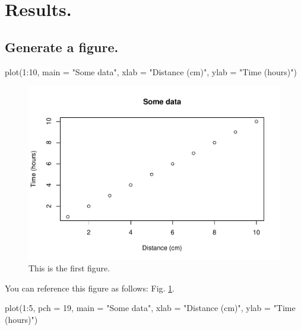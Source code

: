 \documentclass[12pt,halfline,a4paper,]{ouparticle}
\newenvironment{Shaded}{\begin{snugshade}}{\end{snugshade}}
\newcommand{\AttributeTok}[1]{\textcolor[rgb]{0.77,0.63,0.00}{#1}}
\newcommand{\DecValTok}[1]{\textcolor[rgb]{0.00,0.00,0.81}{#1}}
\newcommand{\FunctionTok}[1]{\textcolor[rgb]{0.00,0.00,0.00}{#1}}
\newcommand{\NormalTok}[1]{#1}
\newcommand{\SpecialCharTok}[1]{\textcolor[rgb]{0.00,0.00,0.00}{#1}}
\newcommand{\StringTok}[1]{\textcolor[rgb]{0.31,0.60,0.02}{#1}}
\begin{document}
\hypertarget{results.}{%
\section{Results.}\label{results.}}

\hypertarget{generate-a-figure.}{%
\subsection{Generate a figure.}\label{generate-a-figure.}}

\begin{Shaded}
\begin{Highlighting}[]
\FunctionTok{plot}\NormalTok{(}\DecValTok{1}\SpecialCharTok{:}\DecValTok{10}\NormalTok{, }\AttributeTok{main =} \StringTok{"Some data"}\NormalTok{, }\AttributeTok{xlab =} \StringTok{"Distance (cm)"}\NormalTok{, }
     \AttributeTok{ylab =} \StringTok{"Time (hours)"}\NormalTok{)}
\end{Highlighting}
\end{Shaded}

\begin{figure}[H]
\includegraphics[width=1\linewidth]{assignment_template_files/figure-latex/fig1-1} \caption{This is the first figure.}\label{fig:fig1}
\end{figure}

You can reference this figure as follows: Fig. \ref{fig:fig1}.

\begin{Shaded}
\begin{Highlighting}[]
\FunctionTok{plot}\NormalTok{(}\DecValTok{1}\SpecialCharTok{:}\DecValTok{5}\NormalTok{, }\AttributeTok{pch =} \DecValTok{19}\NormalTok{, }\AttributeTok{main =} \StringTok{"Some data"}\NormalTok{, }\AttributeTok{xlab =} \StringTok{"Distance (cm)"}\NormalTok{, }
     \AttributeTok{ylab =} \StringTok{"Time (hours)"}\NormalTok{)}
\end{Highlighting}
\end{Shaded}
\end{document}
